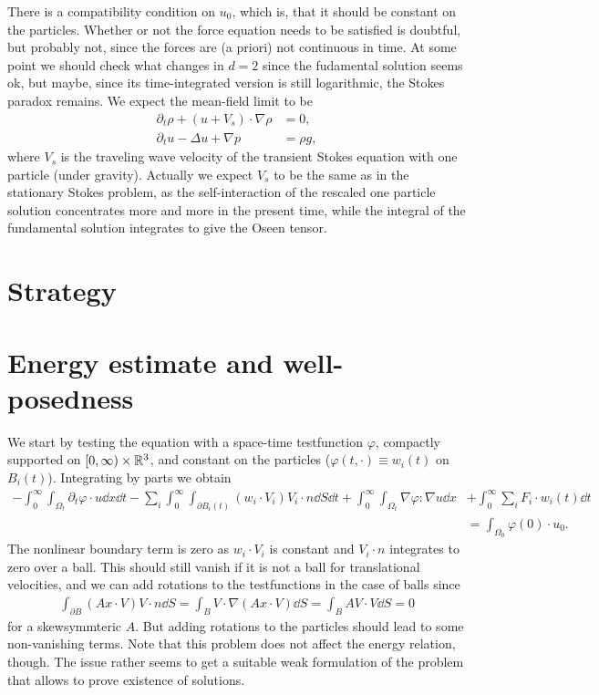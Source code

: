 \documentclass[abstracton, paper=a4, fontsize=11pt,DIV=12,bibliography=totoc]{scrartcl}
\begin{document}
There is a compatibility condition on $u_0$, which is, that it should be constant on the particles. Whether or not the force equation needs to be satisfied is doubtful, but probably not, since the forces are (a priori) not continuous in time. 
At some point we should check what changes in $d=2$ since the fudamental solution seems ok, but maybe, since its time-integrated version is still logarithmic, the Stokes paradox remains.
We expect the mean-field limit to be 
\begin{align*}
    \partial_t \rho+(u+V_s)\cdot\nabla\rho&=0,\\
    \partial_t u-\Delta u+\nabla p&=\rho g,
\end{align*}
where $V_s$ is the traveling wave velocity of the transient Stokes equation with one particle (under gravity). Actually we expect $V_s$ to be the same as in the stationary Stokes problem, as the self-interaction of the rescaled one particle solution concentrates more and more in the present time, while the integral of the fundamental solution integrates to give the Oseen tensor.
\section{Strategy}

\section{Energy estimate and well-posedness}

We start by testing the equation with a space-time testfunction $\varphi$, compactly supported on $[0,\infty)\times \mathbb{R}^3$, and constant on the particles ($\varphi(t,\cdot)\equiv w_i(t)$ on $B_i(t)$). Integrating by parts we obtain
\begin{align*}
     -\int_0^\infty \int_{\Omega_t} \partial_t \varphi \cdot  u\dd x \dd t-\sum_i \int_0^\infty  \int_{\partial B_i(t)}(w_i\cdot V_i)V_i\cdot n \dd S \dd t +\int_0^\infty  \int_{\Omega_t} \nabla\varphi\colon\nabla u\dd x&+\int_0^\infty \sum_i F_i\cdot w_i(t) \dd t \\
     &= \int_{\Omega_0} \varphi(0) \cdot u_0.
\end{align*}
The nonlinear boundary term is zero as $w_i\cdot V_i$ is constant and $V_i\cdot n$ integrates to zero over a ball. This should still vanish if it is not a ball for translational velocities, and we can add rotations to the testfunctions in the case of balls since
\begin{align*}
    \int_{\partial B}(Ax\cdot V)V\cdot n\dd S=\int_B V\cdot \nabla(Ax\cdot V)\dd S=\int_B AV\cdot V \dd S=0
\end{align*}
for a skewsymmteric $A$. But adding rotations to the particles should lead to some non-vanishing terms. Note that this problem does not affect the energy relation, though. The issue rather seems to get a suitable weak formulation of the problem that allows to prove existence of solutions.
\end{document}
